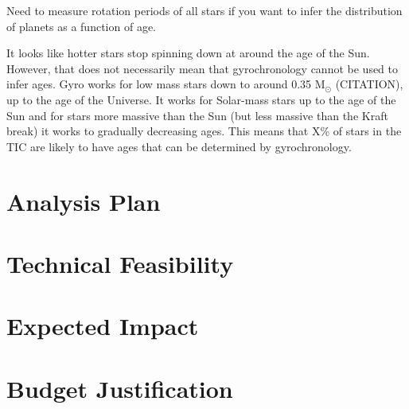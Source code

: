 \documentclass[useAMS, usenatbib, preprint, 12pt]{aastex}
\begin{document}
Need to measure rotation periods of all stars if you want to infer the
distribution of planets as a function of age.

It looks like hotter stars stop spinning down at around the age of the Sun.
However, that does not necessarily mean that gyrochronology cannot be used to
infer ages.
Gyro works for low mass stars down to around 0.35 M$_\odot$ (CITATION), up to
the age of the Universe.
It works for Solar-mass stars up to the age of the Sun and for stars more
massive than the Sun (but less massive than the Kraft break) it works to
gradually decreasing ages.
This means that X\% of stars in the TIC are likely to have ages that can be
determined by gyrochronology.

\section{Analysis Plan}

\section{Technical Feasibility}

\section{Expected Impact}

\section{Budget Justification}



\end{document}

